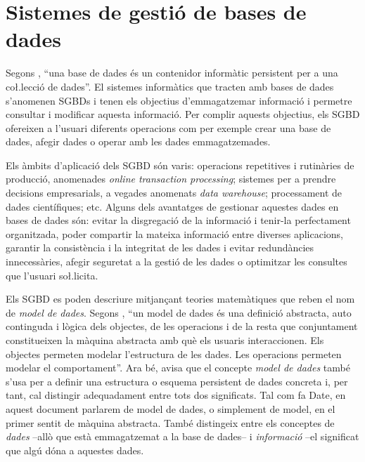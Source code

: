 \section{Sistemes de gestió de bases de dades}
\label{sec:art:sgbd}

Segons \textcite{date:introduction}, ``una base de dades és un
contenidor informàtic persistent per a una co\l.lecció de dades''. El
sistemes informàtics que tracten amb bases de dades s'anomenen
\glspl{SGBD} i tenen els
objectius d'emmagatzemar informació i permetre consultar i modificar
aquesta informació.  Per complir aquests
objectius, els \gls{SGBD} ofereixen a l'usuari diferents operacions com per
exemple crear una base de dades, afegir dades o operar amb les dades
emmagatzemades.

Els àmbits d'aplicació dels \gls{SGBD} són varis: operacions repetitives i
rutinàries de producció, anomenades \emph{online transaction
  processing}; sistemes per a prendre decisions empresarials, a
vegades anomenats \emph{data warehouse}; processament de dades
científiques; etc.  Alguns dels avantatges de gestionar aquestes dades
en bases de dades són: evitar la disgregació de la informació i
tenir-la perfectament organitzada, poder compartir la mateixa
informació entre diverses aplicacions, garantir la consistència i la
integritat de les dades i evitar redundàncies innecessàries, afegir
seguretat a la gestió de les dades o optimitzar les consultes que
l'usuari so\l.licita.


Els \gls{SGBD} es poden descriure mitjançant teories matemàtiques que reben
el nom de \emph{model de dades}.  Segons
\citeauthor{date:introduction}, ``un model de dades és una definició
abstracta, auto continguda i lògica dels objectes, de les operacions i
de la resta que conjuntament constitueixen la màquina abstracta amb
què els usuaris interaccionen. Els objectes permeten modelar
l'estructura de les dades. Les operacions permeten modelar el
comportament''. Ara bé, \citeauthor{date:introduction} avisa que el
concepte \emph{model de dades} també s'usa per a definir una
estructura o esquema persistent de dades concreta i, per tant, cal distingir
adequadament entre tots dos significats.  Tal com fa Date, en aquest
document parlarem de model de dades, o simplement de model, en el
primer sentit de màquina abstracta. També distingeix entre els
conceptes de \emph{dades} --allò que està emmagatzemat a la base de
dades-- i \emph{informació} --el significat que algú dóna a aquestes
dades.


